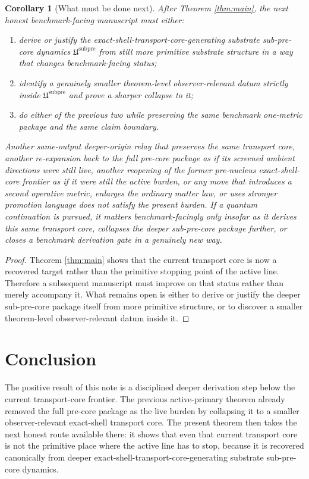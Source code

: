 \documentclass[11pt]{article}
\newcommand{\SubPreCorePackage}{\mathfrak U^{\mathrm{subpre}}}
\newtheorem{corollary}{Corollary}
\begin{document}
\begin{corollary}[What must be done next]
\label{cor:next}
After Theorem \ref{thm:main}, the next honest benchmark-facing manuscript must either:
\begin{enumerate}
    \item derive or justify the exact-shell-transport-core-generating substrate sub-pre-core dynamics \(\SubPreCorePackage\) from still more primitive substrate structure in a way that changes benchmark-facing status;
    \item identify a genuinely smaller theorem-level observer-relevant datum strictly inside \(\SubPreCorePackage\) and prove a sharper collapse to it;
    \item do either of the previous two while preserving the same benchmark one-metric package and the same claim boundary.
\end{enumerate}
Another same-output deeper-origin relay that preserves the same transport core, another re-expansion back to the full pre-core package as if its screened ambient directions were still live, another reopening of the former pre-nucleus exact-shell-core frontier as if it were still the active burden, or any move that introduces a second operative metric, enlarges the ordinary matter law, or uses stronger promotion language does not satisfy the present burden. If a quantum continuation is pursued, it matters benchmark-facingly only insofar as it derives this same transport core, collapses the deeper sub-pre-core package further, or closes a benchmark derivation gate in a genuinely new way.
\end{corollary}

\begin{proof}
Theorem \ref{thm:main} shows that the current transport core is now a recovered target rather than the primitive stopping point of the active line. Therefore a subsequent manuscript must improve on that status rather than merely accompany it. What remains open is either to derive or justify the deeper sub-pre-core package itself from more primitive structure, or to discover a smaller theorem-level observer-relevant datum inside it.
\end{proof}

\section{Conclusion}

The positive result of this note is a disciplined deeper derivation step below the current transport-core frontier. The previous active-primary theorem already removed the full pre-core package as the live burden by collapsing it to a smaller observer-relevant exact-shell transport core. The present theorem then takes the next honest route available there: it shows that even that current transport core is not the primitive place where the active line has to stop, because it is recovered canonically from deeper exact-shell-transport-core-generating substrate sub-pre-core dynamics.
\end{document}

